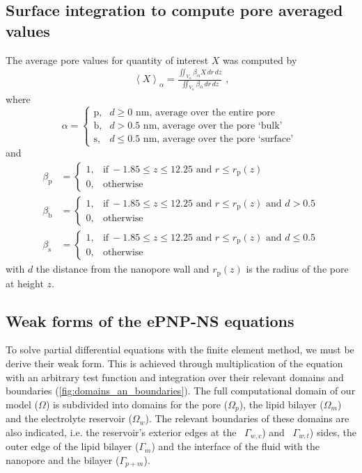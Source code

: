 \documentclass[journal=ancac3, manuscript=suppinfo, etalmode=truncate,maxauthors=0]{achemso}
\begin{document}
\newpage
\subsection{Surface integration to compute pore averaged values}
The average pore values for quantity of interest $X$ was computed by
\begin{align}
  \left< X \right>_{\alpha} =
    \displaystyle\frac{\displaystyle\iint_{V_{\alpha}} \beta_{\alpha} X \,dr\,dz}
                      {\displaystyle\iint_{V_{\alpha}} \beta_{\alpha} \,dr\,dz}
  \text{ ,}
\end{align}
where
\begin{equation}
  \alpha=
  \begin{cases}
    \text{p}, & d \ge 0  \text{~nm} \text{, average over the entire pore} \\
    \text{b}, & d > 0.5  \text{~nm} \text{, average over the pore `bulk' }  \\
    \text{s}, & d \le 0.5\text{~nm} \text{, average over the pore `surface' }
  \end{cases}
\end{equation}
and
\begin{align}
  \beta_{\text{p}} &=
  \begin{cases}
    1, & \text{if}\ -1.85\le z \le 12.25  \text{ and } r \le r_\text{p}(z) \\
    0, & \text{otherwise}
  \end{cases} \\
  \beta_{\text{b}} &=
  \begin{cases}
  1, & \text{if}\ -1.85\le z \le 12.25  \text{ and } r \le r_\text{p}(z) \text{ and } d > 0.5 \\
  0, & \text{otherwise}
  \end{cases} \\
  \beta_{\text{s}} &=
  \begin{cases}
  1, & \text{if}\ -1.85\le z \le 12.25  \text{ and } r \le r_\text{p}(z) \text{ and } d \le 0.5 \\
  0, & \text{otherwise}
  \end{cases}
\end{align}
with $d$ the distance from the nanopore wall and $r_\text{p}(z)$ is the radius of the pore at height $z$.


\newpage
\subsection{Weak forms of the ePNP-NS equations}
To solve partial differential equations with the finite element method, we must be derive their weak form.
This is achieved through multiplication of the equation with an arbitrary test function and integration over
their relevant domains and boundaries (\cref{fig:domains_an_boundaries}). The full computational domain of
our model ($\Omega$) is subdivided into domains for the pore ($\Omega_p$), the lipid bilayer ($\Omega_m$) and
the electrolyte reservoir ($\Omega_w$). The relevant boundaries of these domains are also indicated, i.e. the
reservoir's exterior edges at the \cis\ $\Gamma_{w,c}$) and \trans\ $\Gamma_{w,t}$) sides, the outer edge of
the lipid bilayer ($\Gamma_{m}$) and the interface of the fluid with the nanopore and the bilayer
($\Gamma_{p+m}$).
\end{document}
